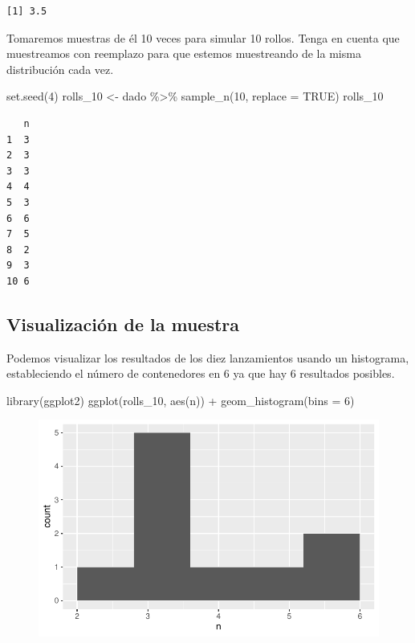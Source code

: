 \documentclass[
  letterpaper,
  DIV=11,
  numbers=noendperiod]{scrreprt}
\newenvironment{Shaded}{\begin{snugshade}}{\end{snugshade}}
\newcommand{\AttributeTok}[1]{\textcolor[rgb]{0.40,0.45,0.13}{#1}}
\newcommand{\ConstantTok}[1]{\textcolor[rgb]{0.56,0.35,0.01}{#1}}
\newcommand{\DecValTok}[1]{\textcolor[rgb]{0.68,0.00,0.00}{#1}}
\newcommand{\FunctionTok}[1]{\textcolor[rgb]{0.28,0.35,0.67}{#1}}
\newcommand{\NormalTok}[1]{\textcolor[rgb]{0.00,0.23,0.31}{#1}}
\newcommand{\OtherTok}[1]{\textcolor[rgb]{0.00,0.23,0.31}{#1}}
\newcommand{\SpecialCharTok}[1]{\textcolor[rgb]{0.37,0.37,0.37}{#1}}
\begin{document}
\begin{verbatim}
[1] 3.5
\end{verbatim}

Tomaremos muestras de él 10 veces para simular 10 rollos. Tenga en
cuenta que muestreamos con reemplazo para que estemos muestreando de la
misma distribución cada vez.

\begin{Shaded}
\begin{Highlighting}[]
\FunctionTok{set.seed}\NormalTok{(}\DecValTok{4}\NormalTok{)}
\NormalTok{rolls\_10 }\OtherTok{\textless{}{-}}\NormalTok{ dado }\SpecialCharTok{\%\textgreater{}\%} 
  \FunctionTok{sample\_n}\NormalTok{(}\DecValTok{10}\NormalTok{, }\AttributeTok{replace =} \ConstantTok{TRUE}\NormalTok{)}
\NormalTok{rolls\_10}
\end{Highlighting}
\end{Shaded}

\begin{verbatim}
   n
1  3
2  3
3  3
4  4
5  3
6  6
7  5
8  2
9  3
10 6
\end{verbatim}

\hypertarget{visualizaciuxf3n-de-la-muestra}{%
\subsection{Visualización de la
muestra}\label{visualizaciuxf3n-de-la-muestra}}

Podemos visualizar los resultados de los diez lanzamientos usando un
histograma, estableciendo el número de contenedores en 6 ya que hay 6
resultados posibles.

\begin{Shaded}
\begin{Highlighting}[]
\FunctionTok{library}\NormalTok{(ggplot2)}
\FunctionTok{ggplot}\NormalTok{(rolls\_10, }\FunctionTok{aes}\NormalTok{(n)) }\SpecialCharTok{+} 
  \FunctionTok{geom\_histogram}\NormalTok{(}\AttributeTok{bins =} \DecValTok{6}\NormalTok{)}
\end{Highlighting}
\end{Shaded}

\begin{figure}[H]

{\centering \includegraphics{summary_files/figure-pdf/unnamed-chunk-10-1.pdf}

}

\end{figure}
\end{document}
